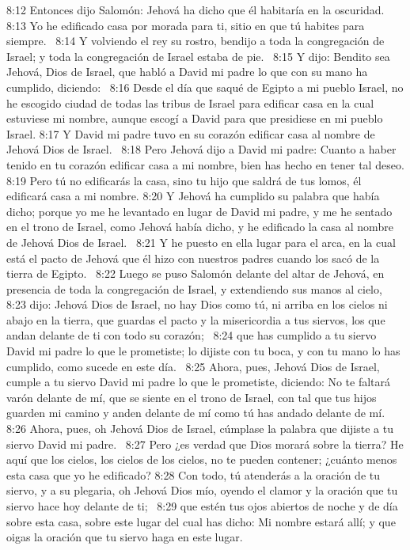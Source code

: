 8:12 Entonces dijo Salomón: Jehová ha dicho que él habitaría en la oscuridad.  
8:13 Yo he edificado casa por morada para ti, sitio en que tú habites para siempre.  
8:14 Y volviendo el rey su rostro, bendijo a toda la congregación de Israel; y toda la congregación de Israel estaba de pie.  
8:15 Y dijo: Bendito sea Jehová, Dios de Israel, que habló a David mi padre lo que con su mano ha cumplido, diciendo:  
8:16 Desde el día que saqué de Egipto a mi pueblo Israel, no he escogido ciudad de todas las tribus de Israel para edificar casa en la cual estuviese mi nombre, aunque escogí a David para que presidiese en mi pueblo Israel. 
8:17 Y David mi padre tuvo en su corazón edificar casa al nombre de Jehová Dios de Israel.  
8:18 Pero Jehová dijo a David mi padre: Cuanto a haber tenido en tu corazón edificar casa a mi nombre, bien has hecho en tener tal deseo. 
8:19 Pero tú no edificarás la casa, sino tu hijo que saldrá de tus lomos, él edificará casa a mi nombre. 
8:20 Y Jehová ha cumplido su palabra que había dicho; porque yo me he levantado en lugar de David mi padre, y me he sentado en el trono de Israel, como Jehová había dicho, y he edificado la casa al nombre de Jehová Dios de Israel.  
8:21 Y he puesto en ella lugar para el arca, en la cual está el pacto de Jehová que él hizo con nuestros padres cuando los sacó de la tierra de Egipto.  
8:22 Luego se puso Salomón delante del altar de Jehová, en presencia de toda la congregación de Israel, y extendiendo sus manos al cielo,  
8:23 dijo: Jehová Dios de Israel, no hay Dios como tú, ni arriba en los cielos ni abajo en la tierra, que guardas el pacto y la misericordia a tus siervos, los que andan delante de ti con todo su corazón;  
8:24 que has cumplido a tu siervo David mi padre lo que le prometiste; lo dijiste con tu boca, y con tu mano lo has cumplido, como sucede en este día.  
8:25 Ahora, pues, Jehová Dios de Israel, cumple a tu siervo David mi padre lo que le prometiste, diciendo: No te faltará varón delante de mí, que se siente en el trono de Israel, con tal que tus hijos guarden mi camino y anden delante de mí como tú has andado delante de mí.  
8:26 Ahora, pues, oh Jehová Dios de Israel, cúmplase la palabra que dijiste a tu siervo David mi padre.  
8:27 Pero ¿es verdad que Dios morará sobre la tierra? He aquí que los cielos, los cielos de los cielos, no te pueden contener; ¿cuánto menos esta casa que yo he edificado? 
8:28 Con todo, tú atenderás a la oración de tu siervo, y a su plegaria, oh Jehová Dios mío, oyendo el clamor y la oración que tu siervo hace hoy delante de ti;  
8:29 que estén tus ojos abiertos de noche y de día sobre esta casa, sobre este lugar del cual has dicho: Mi nombre estará allí; y que oigas la oración que tu siervo haga en este lugar.  
